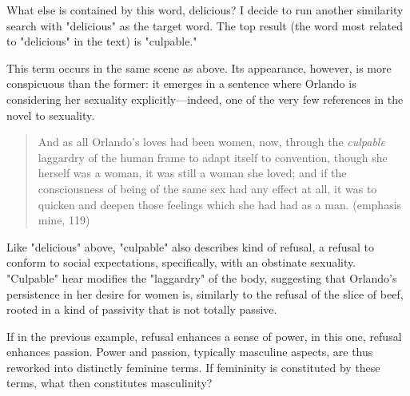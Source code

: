 \documentclass[11pt]{article}
\begin{document}
What else is contained by this word, delicious? I decide to run
another similarity search with "delicious" as the target word. The top
result (the word most related to "delicious" in the text) is
"culpable."

This term occurs in the same scene as above. Its appearance, however,
is more conspicuous than the former: it emerges in a sentence where
Orlando is considering her sexuality explicitly---indeed, one of the
very few references in the novel to sexuality.
\begin{quote}
And as all Orlando’s loves had been women, now, through the \emph{culpable}
laggardry of the human frame to adapt itself to convention, though she
herself was a woman, it was still a woman she loved; and if the
consciousness of being of the same sex had any effect at all, it was
to quicken and deepen those feelings which she had had as a man.
(emphasis mine, 119)
\end{quote}
Like "delicious" above, "culpable" also describes kind of refusal, a
refusal to conform to social expectations, specifically, with an
obstinate sexuality. "Culpable" hear modifies the "laggardry" of the
body, suggesting that Orlando's persistence in her desire for women
is, similarly to the refusal of the slice of beef, rooted in a kind of
passivity that is not totally passive. 

If in the previous example, refusal enhances a sense of power, in this
one, refusal enhances passion. Power and passion, typically masculine
aspects, are thus reworked into distinctly feminine terms. If
femininity is constituted by these terms, what then constitutes
masculinity?
\end{document}
